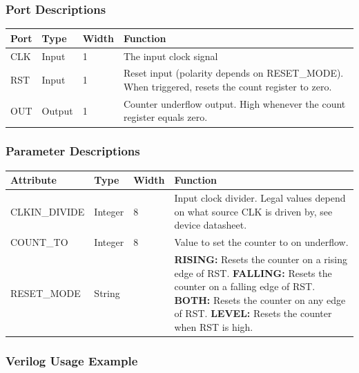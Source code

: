 \documentclass{article}
\begin{document}
\subsubsection{Port Descriptions}

\begin{tabularx}{5in}{|l|l|l|X|}
\hline
{\bfseries Port} & {\bfseries Type} & {\bfseries Width} & {\bfseries Function} \\
\hline
CLK & Input & 1 & The input clock signal\\
\hline
RST & Input & 1 & Reset input (polarity depends on RESET\_MODE). When triggered, resets the count register to zero. \\
\hline
OUT & Output & 1 & Counter underflow output. High whenever the count register equals zero. \\
\hline
\end{tabularx}

\subsubsection{Parameter Descriptions}

\begin{tabularx}{5in}{|l|l|l|X|}
\hline
{\bfseries Attribute} & {\bfseries Type} & {\bfseries Width} & {\bfseries Function} \\
\hline
CLKIN\_DIVIDE & Integer & 8 &
	Input clock divider. Legal values depend on what source CLK is driven by, see device datasheet.\\
\hline
COUNT\_TO & Integer & 8 & Value to set the counter to on underflow. \\
\hline
RESET\_MODE & String &  & 
	{\bfseries RISING: } \newline Resets the counter on a rising edge of RST. \newline
	{\bfseries FALLING: } \newline Resets the counter on a falling edge of RST. \newline
	{\bfseries BOTH: } \newline Resets the counter on any edge of RST. \newline
	{\bfseries LEVEL: } \newline Resets the counter when RST is high. \\
\hline
\end{tabularx}

\subsubsection{Verilog Usage Example}
\end{document}
